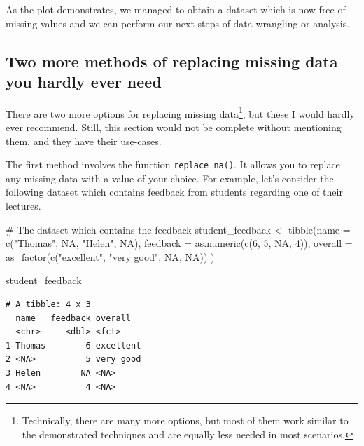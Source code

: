 \documentclass[
  letterpaper,
]{krantz}
\makeatletter
\newenvironment{Shaded}{\begin{snugshade}}{\end{snugshade}}
\newcommand{\AttributeTok}[1]{\textcolor[rgb]{0.40,0.45,0.13}{#1}}
\newcommand{\CommentTok}[1]{\textcolor[rgb]{0.37,0.37,0.37}{#1}}
\newcommand{\ConstantTok}[1]{\textcolor[rgb]{0.56,0.35,0.01}{#1}}
\newcommand{\DecValTok}[1]{\textcolor[rgb]{0.68,0.00,0.00}{#1}}
\newcommand{\FunctionTok}[1]{\textcolor[rgb]{0.28,0.35,0.67}{#1}}
\newcommand{\NormalTok}[1]{\textcolor[rgb]{0.00,0.23,0.31}{#1}}
\newcommand{\OtherTok}[1]{\textcolor[rgb]{0.00,0.23,0.31}{#1}}
\newcommand{\StringTok}[1]{\textcolor[rgb]{0.13,0.47,0.30}{#1}}
\newenvironment{kframe}{%
\medskip{}
\setlength{\fboxsep}{.8em}
 \def\at@end@of@kframe{}%
 \ifinner\ifhmode%
  \def\at@end@of@kframe{\end{minipage}}%
  \begin{minipage}{\columnwidth}%
 \fi\fi%
 \def\FrameCommand##1{\hskip\@totalleftmargin \hskip-\fboxsep
 \colorbox{shadecolor}{##1}\hskip-\fboxsep
     \hskip-\linewidth \hskip-\@totalleftmargin \hskip\columnwidth}%
 \MakeFramed {\advance\hsize-\width
   \@totalleftmargin\z@ \linewidth\hsize
   \@setminipage}}%
 {\par\unskip\endMakeFramed%
 \at@end@of@kframe}
\renewenvironment{Shaded}{\begin{kframe}}{\end{kframe}}
\makeatother
\begin{document}
As the plot demonstrates, we managed to obtain a dataset which is now
free of missing values and we can perform our next steps of data
wrangling or analysis.

\subsection{Two more methods of replacing missing data you hardly ever
need}\label{two-more-methods-of-replacing-missing-data}

There are two more options for replacing missing data\footnote{Technically,
  there are many more options, but most of them work similar to the
  demonstrated techniques and are equally less needed in most scenarios.},
but these I would hardly ever recommend. Still, this section would not
be complete without mentioning them, and they have their use-cases.

The first method involves the function \texttt{replace\_na()}. It allows
you to replace any missing data with a value of your choice. For
example, let's consider the following dataset which contains feedback
from students regarding one of their lectures.

\begin{Shaded}
\begin{Highlighting}[]
\CommentTok{\# The dataset which contains the feedback}
\NormalTok{student\_feedback }\OtherTok{\textless{}{-}} \FunctionTok{tibble}\NormalTok{(}\AttributeTok{name =} \FunctionTok{c}\NormalTok{(}\StringTok{"Thomas"}\NormalTok{, }\ConstantTok{NA}\NormalTok{, }\StringTok{"Helen"}\NormalTok{, }\ConstantTok{NA}\NormalTok{),}
                           \AttributeTok{feedback =} \FunctionTok{as.numeric}\NormalTok{(}\FunctionTok{c}\NormalTok{(}\DecValTok{6}\NormalTok{, }\DecValTok{5}\NormalTok{, }\ConstantTok{NA}\NormalTok{, }\DecValTok{4}\NormalTok{)),}
                           \AttributeTok{overall =} \FunctionTok{as\_factor}\NormalTok{(}\FunctionTok{c}\NormalTok{(}\StringTok{"excellent"}\NormalTok{, }\StringTok{"very good"}\NormalTok{, }\ConstantTok{NA}\NormalTok{, }\ConstantTok{NA}\NormalTok{))}
\NormalTok{                           )}

\NormalTok{student\_feedback}
\end{Highlighting}
\end{Shaded}

\begin{verbatim}
# A tibble: 4 x 3
  name   feedback overall  
  <chr>     <dbl> <fct>    
1 Thomas        6 excellent
2 <NA>          5 very good
3 Helen        NA <NA>     
4 <NA>          4 <NA>     
\end{verbatim}
\end{document}
